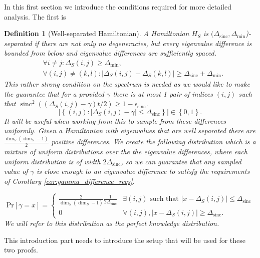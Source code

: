 \documentclass{article}
\newtheorem{definition}{Definition}
\newcommand{\abs}[1]{\left| #1 \right|}
\newcommand{\set}[1]{\left\{ #1 \right\}}
\newcommand{\prob}[1]{\text{Pr}\left[ #1 \right]}
\DeclareMathOperator{\sinc}{sinc}
\begin{document}
In this first section we introduce the conditions required for more detailed analysis. The first is 
\begin{definition}[Well-separated Hamiltonian] \label{def:separated_hamiltonians}
    A Hamiltonian $H_S$ is $(\Delta_{\sinc}, \Delta_{\min}$)-separated if there are not only no degeneracies, but every eigenvalue difference is bounded from below and eigenvalue differences are sufficiently spaced.
    \begin{align}
        &\forall i \neq j : \Delta_{S}(i,j) \geq \Delta_{\min}, \\
        &\forall (i,j) \neq (k,l) : \abs{\Delta_S(i,j) - \Delta_S(k,l)} \geq \Delta_{\sinc} + \Delta_{\min}.
    \end{align}
    This rather strong condition on the spectrum is needed as we would like to make the guarantee that for a provided $\gamma$ there is at most 1 pair of indices $(i,j)$ such that $\sinc^2((\Delta_S(i,j) - \gamma)t/2) \geq 1 - \epsilon_{\sinc}$.
    \begin{equation}
        \abs{\set{(i,j): \abs{\Delta_S(i,j) - \gamma} \leq \Delta_{\sinc}}} \in \set{0, 1}.
    \end{equation}
    It will be useful when working from this to sample from these differences uniformly. Given a Hamiltonian with eigenvalues that are well separated there are $\frac{\dim_S (\dim_S - 1)}{2}$ positive differences. We create the following distribution which is a mixture of uniform distributions over the the eigenvalue differences, where each uniform distribution is of width $2 \Delta_{\sinc}$, so we can guarantee that any sampled value of $\gamma$ is close enough to an eigenvalue difference to satisfy the requirements of Corollary \ref{cor:gamma_difference_reqs}.

    \begin{equation}
        \prob{\gamma = x} = \begin{cases}
            \frac{2}{\dim_S (\dim_S - 1)} \frac{1}{2 \Delta_{\sinc}} & \exists (i,j) \text{ such that } \abs{x - \Delta_S(i,j)} \leq \Delta_{\sinc} \\
            0 & \forall (i,j), \abs{x - \Delta_S(i,j)} \geq \Delta_{\sinc}.
        \end{cases}
    \end{equation}
    We will refer to this distribution as the \emph{perfect knowledge} distribution.
\end{definition}

This introduction part needs to introduce the setup that will be used for these two proofs.
\end{document}
